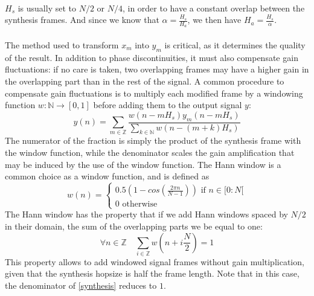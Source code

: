 \documentclass[letterpaper]{article}
\theoremstyle{definition}
\theoremstyle{remark}
\begin{document}
\paragraph{}
\(H_s\) is usually set to \(N/2\) or \(N/4\), in order to have a constant
overlap between the synthesis frames. And since we know that
\(\alpha=\frac{H_s}{H_a}\), we then have \(H_a=\frac{H_s}{\alpha}\).

\paragraph{}
The method used to transform \(x_m\) into \(y_m\) is critical, as it determines
the quality of the result. In addition to phase discontinuities, it must also
compensate gain fluctuations: if no care is taken, two overlapping frames may
have a higher gain in the overlapping part than in the rest of the signal.
A common procedure to compensate gain fluctuations is to multiply each modified
frame by a windowing function \(w:\mathbb{N}\to[0,1]\) before adding them to the
output signal \(y\):
\begin{equation}
	\label{synthesis}
	y(n) = \sum_{m\in\mathbb{Z}}
	\frac{w(n-mH_s)y_m(n-mH_s)}
	{\sum_{k\in\mathbb{N}}w(n-(m + k)H_s)}
\end{equation}
The numerator of the fraction is simply the product of the synthesis frame with
the window function, while the denominator scales the gain amplification that
may be induced by the use of the window function. The Hann window is a common
choice as a window function, and is defined as
\begin{equation}
\label{hann}
w(n)=\begin{cases}
	0.5(1-cos(\frac{2\pi n}{N-1}))\text{ if }n\in[0:N[\\
	0 \text{ otherwise}\end{cases}
\end{equation}
The Hann window has the property that if we add Hann windows spaced by \(N/2\)
in their domain, the sum of the overlapping parts we be equal to one:
\begin{equation}
	\forall n\in\mathbb{Z}\quad\sum_{i\in\mathbb{Z}}w(n + i\frac{N}{2}) = 1
\end{equation}
This property allows to add windowed signal frames without gain multiplication,
given that the synthesis hopsize is half the frame length. Note that in this
case, the denominator of \eqref{synthesis} reduces to \(1\).
\end{document}
